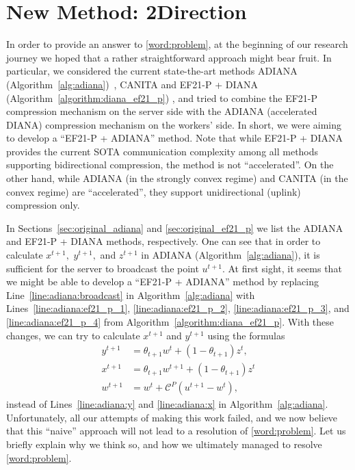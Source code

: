 \documentclass{article} %
\newcommand{\cC}{\mathcal{C}}
\theoremstyle{plain}
\theoremstyle{definition}
\theoremstyle{remark}
\newcommand{\green}{\color{mydarkgreen}}
\newcommand{\algname}[1]{{\small\green\sf #1}}
\begin{document}
\section{New Method: 2Direction}

In order to provide an answer to \ref{word:problem}, at the beginning of our research journey we hoped that a rather straightforward approach might bear fruit. In particular, we considered the current state-the-art methods \algname{ADIANA} (Algorithm~\ref{alg:adiana})~\citep{ADIANA}, \algname{CANITA} \citep{li2021canita} and \algname{EF21-P + DIANA} (Algorithm~\ref{algorithm:diana_ef21_p}) \citep{gruntkowska2022ef21}, and tried to combine the \algname{EF21-P} compression mechanism on the server side with the \algname{ADIANA} (accelerated \algname{DIANA}) compression mechanism on the workers' side. In short, we were aiming to develop a ``\algname{EF21-P + ADIANA}'' method.
Note that while \algname{EF21-P + DIANA}  provides the current SOTA communication complexity among all methods supporting bidirectional compression, the method is not ``accelerated''. On the other hand, while \algname{ADIANA} (in the strongly convex regime) and \algname{CANITA}  (in the convex regime) are ``accelerated'', they support unidirectional (uplink) compression only.

In Sections~\ref{sec:original_adiana} and \ref{sec:original_ef21_p} we list the \algname{ADIANA} and \algname{EF21-P + DIANA} methods, respectively. One can see that in order to calculate $x^{t+1},$ $y^{t+1},$ and $z^{t+1}$ in \algname{ADIANA}  (Algorithm~\ref{alg:adiana}), it is sufficient for the server to broadcast the point $u^{t+1}$. At first sight, it seems  that we might be able to develop a ``\algname{EF21-P + ADIANA}'' method  by replacing Line~\ref{line:adiana:broadcast} in Algorithm~\ref{alg:adiana} with Lines~\ref{line:adiana:ef21_p_1}, \ref{line:adiana:ef21_p_2}, \ref{line:adiana:ef21_p_3}, and \ref{line:adiana:ef21_p_4} from Algorithm~\ref{algorithm:diana_ef21_p}. With these changes, we can try to calculate $x^{t+1}$ and $y^{t+1}$ using the  formulas
\begin{align}
  y^{t+1} &= \theta_{t+1} w^t + (1 - \theta_{t+1}) z^t, \label{eq:new_y}\\
 x^{t+1}  &= \theta_{t+1} w^{t+1} + (1 - \theta_{t+1}) z^t \label{eq:new_x}\\
 w^{t+1}  &= w^t + \cC^{P}\left(u^{t+1} - w^t\right) \label{eq:new_w},
\end{align}
instead of Lines~\ref{line:adiana:y} and \ref{line:adiana:x} in Algorithm~\ref{alg:adiana}. Unfortunately, all our attempts of making this work failed, and we now believe that this ``naive'' approach will not lead to a resolution of \ref{word:problem}. Let us briefly explain why we think so, and how we ultimately managed to resolve \ref{word:problem}.
\end{document}

